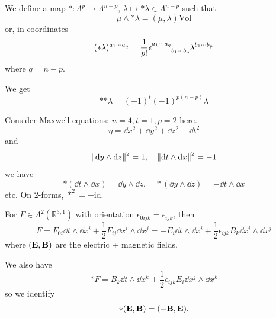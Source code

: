 \documentclass[a4paper,11pt]{article}
\begin{document}
    We define a map $*:\Lambda^p \to \Lambda^{n-p}$, $\lambda \mapsto *\lambda \in \Lambda^{n-p}$ such that 
    \begin{equation}
        \mu \wedge * \lambda = (\mu, \lambda) \text{Vol}
    \end{equation}
    or, in coordinates 
    \begin{equation}
        (* \lambda)^{a_1\cdots a_q} = \frac{1}{p!} \epsilon\indices{^{a_1 \cdots a_q}_{b_1 \cdots b_p}} \lambda^{b_1 \cdots b_p}
    \end{equation}
    where $q = n-p$.

    We get 
    \begin{equation}
        *{*\lambda} = (-1)^t (-1)^{p(n-p)} \lambda
    \end{equation}

    \begin{ex}
        Consider Maxwell equations: $n=4,t=1,p=2$ here. 
        \begin{equation}
            \eta = \dd{x^2} + \dd{y^2} + \dd{z^2} - \dd{t^2}
        \end{equation}
        and 
        \begin{equation}
            \norm{\dd{y}\wedge \dd{z}}^2 = 1, \quad \norm{\dd{t}\wedge \dd{x}}^2 = -1
        \end{equation}
        we have 
        \begin{equation}
            *(\dd{t}\wedge \dd{x}) = \dd y \wedge \dd z, \quad *(\dd y \wedge \dd z) = - \dd t \wedge \dd x
        \end{equation}
        etc. On $2$-forms, $*^2 = - \text{id}$. 

        For $F \in \Lambda^2(\mathbb{R}^{3,1})$ with orientation $\epsilon_{0ijk} = \epsilon_{ijk}$, then 
        \begin{equation}
            F = F_{0i} \dd {t} \wedge \dd {x^i} + \frac{1}{2} F_{ij} \dd {x^i} \wedge \dd {x^j} = - E_i \dd{t} \wedge \dd{x^i} + \frac{1}{2} \epsilon_{ijk} B_k \dd{x^i} \wedge \dd{x^j}
        \end{equation}
        where $(\vb E, \vb B)$ are the electric + magnetic fields. 
        
        We also have 
        \begin{equation}
            * F = B_k \dd{t}\wedge \dd{x^k} + \frac{1}{2} \epsilon_{ijk} E_i \dd{x^j} \wedge \dd{x^k}
        \end{equation}
        so we identify 
        \begin{equation}
            *(\vb E, \vb B) = (- \vb B, \vb E).
        \end{equation}


\end{ex}
\end{document}

